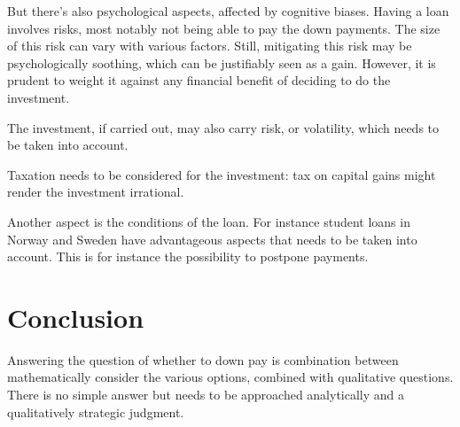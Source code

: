 \documentclass[a4paper]{article}
\begin{document}
But there's also psychological aspects, affected by cognitive biases. Having a
loan involves risks, most notably not being able to pay the down payments. The
size of this risk can vary with various factors. Still, mitigating this risk may
be psychologically soothing, which can be justifiably seen as a gain. However,
it is prudent to weight it against any financial benefit of deciding to do the
investment.

The investment, if carried out, may also carry risk, or volatility, which needs
to be taken into account.

Taxation needs to be considered for the investment: tax on capital gains might
render the investment irrational.

Another aspect is the conditions of the loan. For instance student loans in
Norway and Sweden have advantageous aspects that needs to be taken into account.
This is for instance the possibility to postpone payments.

\section{Conclusion}

Answering the question of whether to down pay is combination between
mathematically consider the various options, combined with qualitative
questions. There is no simple answer but needs to be approached analytically and
a qualitatively strategic judgment.
\end{document}
